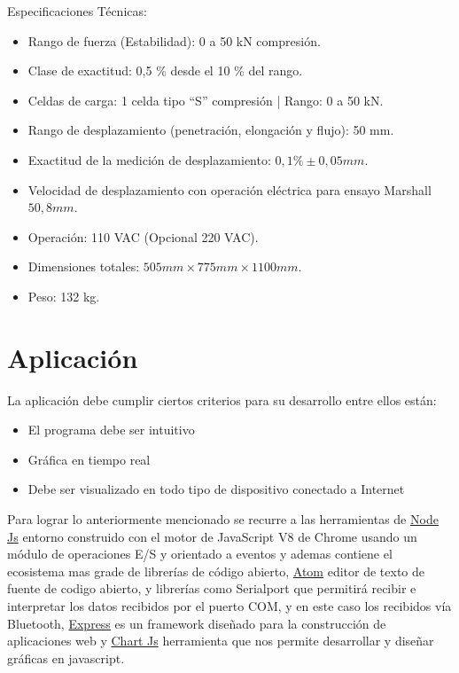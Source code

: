 Especificaciones Técnicas:

\begin{itemize}
\item Rango de fuerza (Estabilidad): 0 a 50 kN compresión.
\item Clase de exactitud: 0,5 \% desde el 10 \% del rango.
\item Celdas de carga: 1 celda tipo “S” compresión | Rango: 0 a 50 kN.
\item Rango de desplazamiento (penetración, elongación y flujo): 50 mm.
\item Exactitud de la medición de desplazamiento: $0,1 \% \pm 0,05 mm$.
\item Velocidad de desplazamiento con operación eléctrica para ensayo Marshall $50,8 mm$.
\item Operación: 110 VAC (Opcional 220 VAC).
\item Dimensiones totales: $505 mm \times 775 mm \times 1 100 mm$.
\item Peso: 132 kg.
\end{itemize}


\section{Aplicación}

La aplicación debe cumplir ciertos criterios para su desarrollo entre ellos están: 

\begin{itemize}
\item El programa debe ser intuitivo
\item Gráfica en tiempo real
\item Debe ser visualizado en todo tipo de dispositivo conectado a Internet
\end{itemize}

Para lograr lo anteriormente mencionado se recurre a las herramientas de \href{https://nodejs.org/es/}{Node Js} entorno construido con el motor de JavaScript V8 de Chrome usando un módulo de operaciones E/S y orientado a eventos y ademas contiene el ecosistema mas grade de librerías de código abierto, \href{https://atom.io/}{Atom} editor de texto de fuente de codigo abierto, y librerías como Serialport que permitirá recibir e interpretar los datos recibidos por el puerto COM, y en este caso los recibidos vía Bluetooth, \href{http://expressjs.com/es/}{Express} es un framework diseñado para la construcción de aplicaciones web y \href{https://www.chartjs.org/}{Chart Js} herramienta que nos permite desarrollar y diseñar gráficas en javascript.\\

